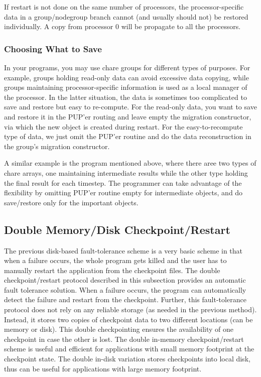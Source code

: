 If restart is not done on the same number of processors, the processor-specific
data in a group/nodegroup branch cannot (and usually should not) be 
restored individually. A copy from processor 0 will be propagate to all 
the processors.

\subsubsection{Choosing What to Save}

In your programs, you may use chare groups for different types of purposes. 
For example, groups holding read-only data can avoid excessive data copying,
while groups maintaining processor-specific information is used as a local
manager of the processor. In the latter situation, the data is sometimes
too complicated to save and restore but easy to re-compute. For the read-only
data, you want to save and restore it in the PUP'er routing and leave empty
the migration constructor, via which the new object is created during restart.
For the easy-to-recompute type of data, we just omit the PUP'er routine and
do the data reconstruction in the group's migration constructor.

A similar example is the program mentioned above, where there aree two 
types of chare arrays, one maintaining intermediate results while the 
other type holding the final result for each timestep. The programmer 
can take advantage of the flexibility by omitting PUP'er routine empty
for intermediate objects, and do save/restore only for the important 
objects. 

\subsection{Double Memory/Disk Checkpoint/Restart}

\label{sec:MemCheckpointing}

The previous disk-based fault-tolerance scheme is a very basic scheme in 
that when a failure occurs, the whole program gets killed and the user has to
manually restart the application from the checkpoint files.
The double checkpoint/restart protocol described in this subsection
provides an automatic fault tolerance solution. When a failure occurs,
the program can automatically detect the failure and restart from the 
checkpoint.
Further, this fault-tolerance protocol does not rely on any reliable
storage (as needed in the previous method). 
Instead, it stores two copies of checkpoint data to two different
locations (can be memory or disk).
This double checkpointing ensures the availability of one checkpoint in case
the other is lost. 
The double in-memory checkpoint/restart scheme is useful and efficient
for applications with small memory footprint at the checkpoint state. 
The double in-disk variation stores checkpoints into local disk, thus 
can be useful for applications with large memory footprint. 


